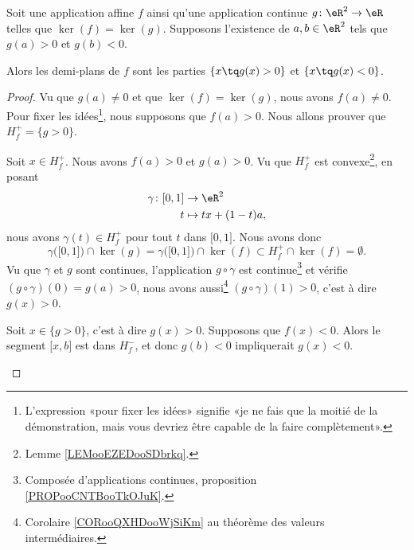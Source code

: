 \begin{lemma}       \label{LEMooURPNooYRsuaI}
	Soit une application affine \( f\) ainsi qu'une application continue \( g\colon \eR^2\to \eR\) telles que \( \ker(f)=\ker(g)\). Supposons l'existence de \( a,b\in \eR^2\) tels que \( g(a)>0\) et \( g(b)<0\).

	Alors les demi-plans de \( f\) sont les parties \( \{ x\tq g(x)>0 \}\) et \( \{ x\tq g(x)<0 \}\).
\end{lemma}

\begin{proof}
	Vu que \( g(a)\neq 0\) et que \( \ker(f)=\ker(g)\), nous avons \( f(a)\neq 0\). Pour fixer les idées\footnote{L'expression «pour fixer les idées» signifie «je ne fais que la moitié de la démonstration, mais vous devriez être capable de la faire complètement».}, nous supposons que \( f(a)>0\). Nous allons prouver que \( H_f^+=\{ g>0 \}\).

	\begin{subproof}
		\spitem[\( H_f^+\subset\{ g>0 \}\)]
		Soit \( x\in H_f^+\). Nous avons \( f(a)>0\) et \( g(a)>0\). Vu que \( H_f^+\) est convexe\footnote{Lemme \ref{LEMooEZEDooSDbrkq}.}, en posant
		\begin{equation}
			\begin{aligned}
				\gamma\colon \mathopen[ 0,1\mathclose] & \to \eR^2             \\
				t                                      & \mapsto tx+(1-t)a   ,
			\end{aligned}
		\end{equation}
		nous avons \( \gamma(t)\in H_f^+\) pour tout \( t\) dans \( \mathopen[ 0,1\mathclose]\). Nous avons donc
		\begin{equation}
			\gamma\big( \mathopen[ 0,1\mathclose] \big)\cap\ker(g)= 			\gamma\big( \mathopen[ 0,1\mathclose] \big)\cap\ker(f)\subset H^+_f\cap\ker(f)=\emptyset.
		\end{equation}
		Vu que \( \gamma\) et \( g\) sont continues, l'application \( g\circ\gamma\) est continue\footnote{Composée d'applications continues, proposition \ref{PROPooCNTBooTkOJuK}.} et vérifie \( (g\circ \gamma)(0)=g(a)>0\), nous avons aussi\footnote{Corolaire \ref{CORooQXHDooWjSiKm} au théorème des valeurs intermédiaires.} \( (g\circ\gamma)(1)>0\), c'est à dire \( g(x)>0\).

		\spitem[\( \{ g>0 \}\subset H_f^+\)]
		Soit \( x\in \{ g>0 \}\), c'est à dire \( g(x)>0\). Supposons que \( f(x)<0\). Alors le segment \( \mathopen[ x,b\mathclose]\) est dans \( H_f^-\), et donc \( g(b)<0\) impliquerait \( g(x)<0\).
	\end{subproof}
\end{proof}

